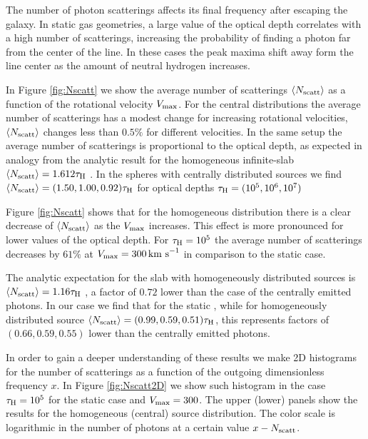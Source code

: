\documentclass{emulateapj}
\newcommand{\ly}{{\ifmmode{{\rm Ly}\alpha~}\else{Ly$\alpha$~}\fi}}
\newcommand{\kms}{{\ifmmode{{\mathrm{\,km\ s}^{-1}}}\else{\,km~s$^{-1}$}\fi}}
\begin{document}
The number of \ly photon scatterings affects its final frequency after
escaping the galaxy. In static gas geometries, a large value of the
optical depth correlates with a high number of scatterings, increasing
the probability of finding a \ly photon far from the center of the
line. In these cases the peak maxima shift away form the line center as
the amount of neutral hydrogen increases. 


In Figure \ref{fig:Nscatt} we show the average number of scatterings
$\langle N_{\rm scatt}\rangle$ as a function of the rotational velocity
$V_{\rm max}$. For the central distributions the average number of
scatterings has a modest change for increasing rotational
velocities, $\langle N_{\rm scatt}\rangle$ changes less than $0.5\%$
for different velocities. In the same setup the average
number of scatterings is proportional to the optical depth, as
expected in analogy from the analytic result for the homogeneous
infinite-slab $\langle N_{\rm  scatt}\rangle=1.612\tau_{\rm   H}$
\citep{Adams72,Harrington73}. In the spheres with centrally
distributed sources we find $\langle N_{\rm
  scatt}\rangle= (1.50, 1.00, 0.92)\tau_{\rm   H}$ for optical depths
$\tau_{\rm H} = (10^{5}, 10^{6}, 10^{7})$


Figure \ref{fig:Nscatt} shows that for the homogeneous distribution
there is a clear decrease of $\langle N_{\rm  scatt}\rangle$ as the
$V_{\rm max}$ increases. This effect is more pronounced for lower
values of the optical depth. For $\tau_{\rm H}=10^5$ the average
number of scatterings decreases by $61\%$ at $V_{\rm max}=300\kms$ in
comparison to the static case. 

The analytic expectation for the slab with homogeneously distributed
sources is $\langle N_{\rm  scatt}\rangle=1.16\tau_{\rm   H}$
\citep{Harrington73}, a factor of $0.72$ lower than the case of the
centrally emitted photons. In our case we find that for the static
, while for homogeneously distributed source $\langle N_{\rm
  scatt}\rangle= (0.99, 0.59, 0.51)\tau_{\rm   H}$, this represents 
  factors of $(0.66, 0.59, 0.55)$ lower than the centrally emitted
  photons. 

In order to gain a deeper understanding of these results we make 2D
histograms for the number of scatterings as a function of the outgoing
dimensionless frequency $x$. In Figure \ref{fig:Nscatt2D} we show
such histogram in the case $\tau_{\rm H}=10^5$ for the
static case and $V_{\rm max}=300$\kms. The upper (lower) panels show the
results for the homogeneous (central) source distribution. The color
scale is logarithmic in the number of photons at a certain value
$x-N_{\rm scatt}$. 
\end{document}
